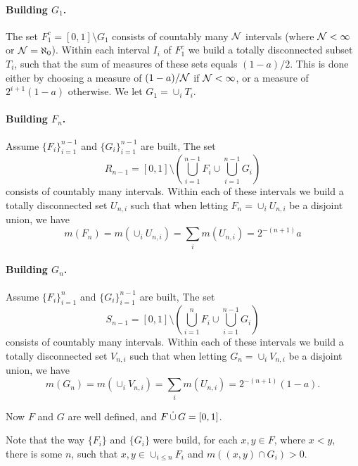 \begin{enumerate}
\paragraph{Building \(G_1\).}
The set \(F_1^c = [0,1]\setminus G_1\) consists of countably many \(\cal{N}\)
intervals (where \(\cal{N}<\infty\) or \({\cal{N}} = \aleph_0\)).
Within each interval \(I_i\) of \(F_1^c\) we build a totally disconnected
subset \(T_i\), such that the sum of measures of these sets equals \((1-a)/2\).
This is done either by choosing a measure of
\((1-a)/\cal{N}\) if  \(\cal{N}<\infty\),
or a measure of \(2^{i+1}(1-a)\) otherwise.
We let \(G_1= \cup_i T_i\).


\paragraph{Building \(F_n\).}
Assume \(\{F_i\}_{i=1}^{n-1}\)
and \(\{G_i\}_{i=1}^{n-1}\) are built,
The set
\begin{equation*}
 R_{n-1} = [0,1] \setminus
  \left( \bigcup_{i=1}^{n-1} F_i \cup \bigcup_{i=1}^{n-1} G_i\right)
\end{equation*}
consists of countably many intervals.
Within each of these intervals we build a totally disconnected set \(U_{n,i}\)
such that when letting \(F_n = \cup_i U_{n,i}\) be a disjoint union, we have
\begin{equation*}
m(F_n) = m\left(\cup_i U_{n,i}\right) = \sum_i m(U_{n,i}) = 2^{-(n+1)} a
\end{equation*}

\paragraph{Building \(G_n\).}
Assume \(\{F_i\}_{i=1}^{n}\)
and \(\{G_i\}_{i=1}^{n-1}\) are built,
The set
\begin{equation*}
 S_{n-1} = [0,1] \setminus
  \left( \bigcup_{i=1}^n F_i \cup \bigcup_{i=1}^{n-1} G_i\right)
\end{equation*}
consists of countably many intervals.
Within each of these intervals we build a totally disconnected set \(V_{n,i}\)
such that when letting \(G_n = \cup_i V_{n,i}\) be a disjoint union, we have
\begin{equation*}
m(G_n) = m\left(\cup_i V_{n,i}\right) = \sum_i m(U_{n,i}) = 2^{-(n+1)} (1-a).
\end{equation*}

Now $F$ and $G$ are well defined, and \(F\disjunion G = [0,1]\).

Note that the way \(\{F_i\}\) and \(\{G_i\}\) were build,
for each \(x,y\in F\), where \(x<y\), there is some $n$, such that
\(x,y\in \cup_{i\leq n} F_i\) and \(m((x,y) \cap G_i) > 0\).


\end{enumerate}
